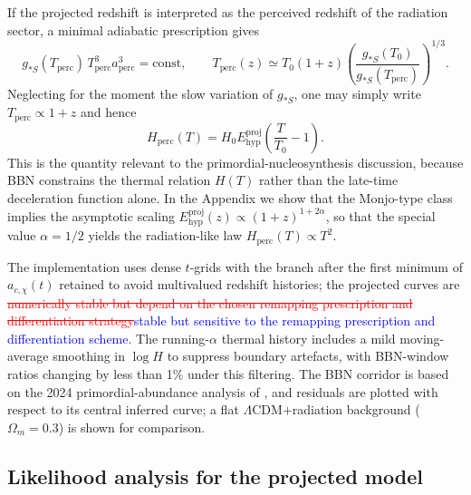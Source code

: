 \documentclass[preprint,12pt]{elsarticle}
\begin{document}
If the projected redshift is interpreted as the perceived redshift of the radiation sector, a minimal adiabatic prescription gives
\begin{equation}
g_{*S}(T_{\mathrm{perc}})\,T_{\mathrm{perc}}^3 a_{\mathrm{perc}}^3=
\mathrm{const},
\qquad
T_{\mathrm{perc}}(z)\simeq T_0(1+z)
\left(\frac{g_{*S}(T_0)}{g_{*S}(T_{\mathrm{perc}})}\right)^{1/3}.
\end{equation}
Neglecting for the moment the slow variation of $g_{*S}$, one may simply write $T_{\mathrm{perc}}\propto 1+z$ and hence
\begin{equation}
H_{\mathrm{perc}}(T)=H_0 E_{\mathrm{hyp}}^{\mathrm{proj}}\!\left(\frac{T}{T_0}-1\right).
\end{equation}
This is the quantity relevant to the primordial-nucleosynthesis discussion, because BBN constrains the thermal relation $H(T)$ rather than the late-time deceleration function alone. In the Appendix we show that the Monjo-type class implies the asymptotic scaling $E_{\mathrm{hyp}}^{\mathrm{proj}}(z)\propto (1+z)^{1+2\alpha}$, so that the special value $\alpha=1/2$ yields the radiation-like law $H_{\mathrm{perc}}(T)\propto T^2$.

The implementation uses dense $t$-grids with the branch after the first minimum of $a_{c,\chi}(t)$ retained to avoid multivalued redshift histories; the projected curves are \textcolor{red}{\sout{numerically stable but depend on the chosen remapping prescription and differentiation strategy}}\textcolor{blue}{stable but sensitive to the remapping prescription and differentiation scheme}. The running-$\alpha$ thermal history includes a mild moving-average smoothing in $\log H$ to suppress boundary artefacts, with BBN-window ratios changing by less than 1\% under this filtering. The BBN corridor is based on the 2024 primordial-abundance analysis of \cite{schoneberg2024bbn}, and residuals are plotted with respect to its central inferred curve; a flat $\Lambda$CDM$+$radiation background ($\Omega_m=0.3$) is shown for comparison.

\subsection{Likelihood analysis for the projected model}
\end{document}
